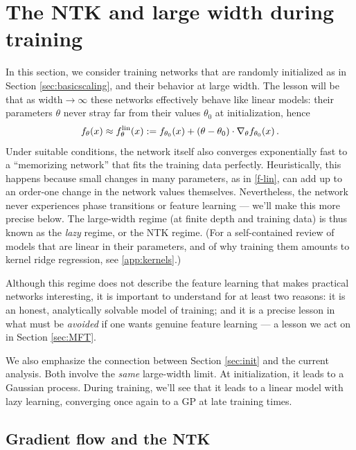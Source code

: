 \documentclass[11pt]{article}
\begin{document}
\section{The NTK and large width during training}
\label{sec:train}

In this section, we consider training networks that are randomly initialized as in Section \ref{sec:basicscaling}, and their behavior at large width. The lesson will be that as width$\to\infty$ these networks effectively behave like linear models: their parameters $\theta$ never stray far from their values $\theta_0$ at initialization, hence
%
\begin{equation}
    f_\theta(x) \approx f^{\rm lin}_\theta(x) := f_{\theta_0}(x) + (\theta-\theta_0)\cdot \nabla_\theta f_{\theta_0}(x)\,. \label{f-lin}
\end{equation} 
%
Under suitable conditions, the network itself also converges exponentially fast to a ``memorizing network'' that fits the training data perfectly. Heuristically, this happens because small changes in many parameters, as in \eqref{f-lin}, can add up to an order-one change in the network values themselves. Nevertheless, the network never experiences phase transitions or feature learning --- we'll make this more precise below. The large-width regime (at finite depth and training data) is thus known as the \emph{lazy} regime, or the NTK regime. (For a self-contained review of models that are linear in their parameters, and of why training them amounts to kernel ridge regression, see \cref{app:kernels}.)

Although this regime does not describe the feature learning that makes practical networks interesting, it is important to understand for at least two reasons: it is an honest, analytically solvable model of training; and it is a precise lesson in what must be \emph{avoided} if one wants genuine feature learning --- a lesson we act on in Section \ref{sec:MFT}.

We also emphasize the connection between Section \ref{sec:init} and the current analysis. Both involve the \emph{same} large-width limit. At initialization, it leads to a Gaussian process. During training, we'll see that it leads to a linear model with lazy learning, converging once again to a GP at late training times.


\subsection{Gradient flow and the NTK}
\label{sec:NTK}
\end{document}
